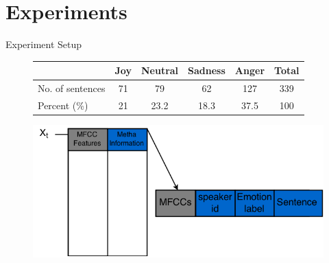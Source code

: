 		
\section{Experiments}
	\begin{frame}[t]{Experiment Setup}
	  \begin{figure}
		    \begin{tabular}{l|*{4}{c}|c}
			  & Joy & Neutral & Sadness & Anger & Total\\
			\hline
			No. of sentences &71	&79	&62	&127 & 339\\
			\hline
		    Percent (\%) &21 & 23.2 & 18.3& 37.5 & 100
		    \end{tabular}
	  \end{figure}
	  \begin{figure}
	   \includegraphics[scale=0.3]{DataStruct.png}
	  \end{figure}
	\end{frame}

